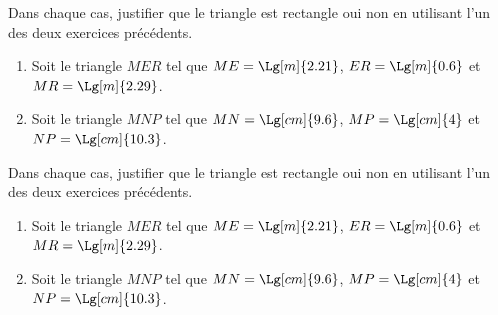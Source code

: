 \begin{exercice*}
    Dans chaque cas, justifier que le triangle est rectangle oui non en utilisant l'un des deux exercices précédents.
    \begin{enumerate}
        \item Soit le triangle $MER$ tel que $ME=\Lg[m]{2.21}$, $ER=\Lg[m]{0.6}$ et $MR=\Lg[m]{2.29}$.
        \item Soit le triangle $MNP$ tel que $MN=\Lg[cm]{9.6}$, $MP=\Lg[cm]{4}$ et $NP=\Lg[cm]{10.3}$.
    \end{enumerate}
\end{exercice*}
\begin{corrige}
    Dans chaque cas, justifier que le triangle est rectangle oui non en utilisant l'un des deux exercices précédents.
    \begin{enumerate}
        \item Soit le triangle $MER$ tel que $ME=\Lg[m]{2.21}$, $ER=\Lg[m]{0.6}$ et $MR=\Lg[m]{2.29}$.
        
        {\red {}}
        \item Soit le triangle $MNP$ tel que $MN=\Lg[cm]{9.6}$, $MP=\Lg[cm]{4}$ et $NP=\Lg[cm]{10.3}$.
        
        {\red {}}
    \end{enumerate}
\end{corrige}


